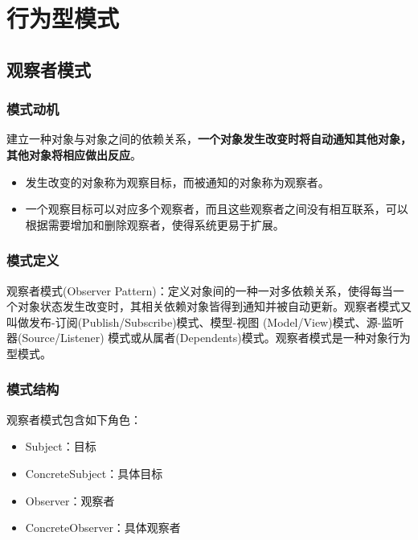 \section{行为型模式}

\subsection{观察者模式}

\subsubsection{模式动机}
建立一种对象与对象之间的依赖关系，\textbf{一个对象发生改变时将自动通知其他对象，其他对象将相应做出反应}。
\begin{itemize}
    \item 发生改变的对象称为观察目标，而被通知的对象称为观察者。
    \item 一个观察目标可以对应多个观察者，而且这些观察者之间没有相互联系，可以根据需要增加和删除观察者，使得系统更易于扩展。
\end{itemize}

\subsubsection{模式定义}
观察者模式(Observer Pattern)：定义对象间的一种一对多依赖关系，使得每当一个对象状态发生改变时，其相关依赖对象皆得到通知并被自动更新。观察者模式又叫做发布-订阅(Publish/Subscribe)模式、模型-视图 (Model/View)模式、源-监听器(Source/Listener) 模式或从属者(Dependents)模式。观察者模式是一种对象行为型模式。

\subsubsection{模式结构}
观察者模式包含如下角色：
\vspace{-0.8em}
\begin{multicols}{2}
    \begin{itemize}
        \item Subject：目标
        \item ConcreteSubject：具体目标
        \item Observer：观察者
        \item ConcreteObserver：具体观察者
    \end{itemize}
\end{multicols}
\vspace{-1em}

